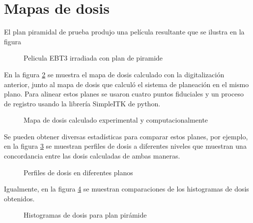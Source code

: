 \section{Mapas de dosis}


El plan piramidal de prueba produjo una película resultante que se ilustra en la figura \\
\begin{figure}
	\centering
	
	\caption{Pelicula EBT3 irradiada con plan de piramide }
	\label{fig:piramideEscaneada}
\end{figure}

En la figura \ref{fig:mapaPiramide} se muestra el mapa de dosis calculado con la digitalización anterior, junto al mapa de dosis que calculó el sistema de planeación en el mismo plano. Para alinear estos planes se usaron cuatro puntos fiduciales y un proceso de registro usando la librería SimpleITK de python.\\

\begin{figure}
	\centering
	
	\caption{Mapa de dosis calculado experimental y computacionalmente }
	\label{fig:mapaPiramide}
\end{figure}

Se pueden obtener diversas estadísticas para comparar estos planes, por ejemplo, en la figura \ref{fig:perfilesDosisPiramide} se muestran perfiles de dosis a diferentes niveles que muestran una concordancia entre las dosis calculadas de ambas maneras.\\
\begin{figure}
	\centering
	
	\caption{Perfiles de dosis en diferentes planos }
	\label{fig:perfilesDosisPiramide}
\end{figure}
Igualmente, en la figura \ref{fig:histogramasDosisPiramide} se muestran comparaciones de los histogramas de dosis obtenidos.\\
\begin{figure}
	\centering
	
	\caption{Histogramas de dosis para plan pirámide }
	\label{fig:histogramasDosisPiramide}
\end{figure}

